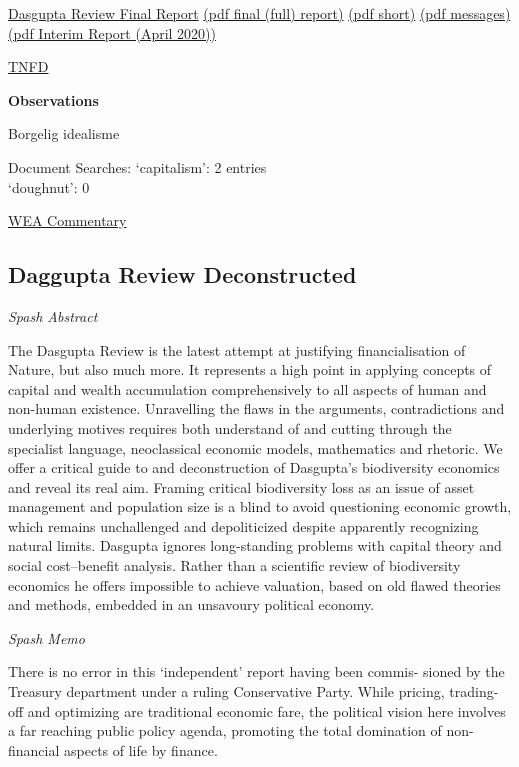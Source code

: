 \documentclass[
]{book}
\begin{document}
\href{https://www.gov.uk/government/publications/final-report-the-economics-of-biodiversity-the-dasgupta-review}{Dasgupta Review Final Report}
\href{pdf/Dasgupta_2021_Final.pdf}{(pdf final (full) report)}
\href{pdf/Dasgupta_2021_Short.pdf}{(pdf short)}
\href{pdf/Dasgupta_2021_Messages.pdf}{(pdf messages)}
\href{pdf/Dasgupta_2021_Interim.pdf}{(pdf Interim Report (April 2020))}

\href{https://tnfd.info/}{TNFD}

\textbf{Observations}

Borgelig idealisme

Document Searches:
`capitalism': 2 entries\\
`doughnut': 0

\href{https://www.worldeconomicsassociation.org/newsletterarticles/the-dasgupta-review/}{WEA Commentary}

\hypertarget{daggupta-review-deconstructed}{%
\subsection{Daggupta Review Deconstructed}\label{daggupta-review-deconstructed}}

\emph{Spash Abstract}

The Dasgupta Review is the latest attempt at justifying financialisation of
Nature, but also much more. It represents a high point in applying concepts
of capital and wealth accumulation comprehensively to all aspects of human
and non-human existence. Unravelling the flaws in the arguments,
contradictions and underlying motives requires both understand of and
cutting through the specialist language, neoclassical economic models,
mathematics and rhetoric. We offer a critical guide to and deconstruction of
Dasgupta's biodiversity economics and reveal its real aim. Framing critical
biodiversity loss as an issue of asset management and population size is a
blind to avoid questioning economic growth, which remains unchallenged
and depoliticized despite apparently recognizing natural limits. Dasgupta
ignores long-standing problems with capital theory and social cost--benefit
analysis. Rather than a scientific review of biodiversity economics he offers
impossible to achieve valuation, based on old flawed theories and methods,
embedded in an unsavoury political economy.

\emph{Spash Memo}

There is no error in this `independent' report having been commis-
sioned by the Treasury department under a ruling Conservative Party. While pricing, trading-off
and optimizing are traditional economic fare, the political vision here involves a far reaching public
policy agenda, promoting the total domination of non-financial aspects of life by finance.
\end{document}
